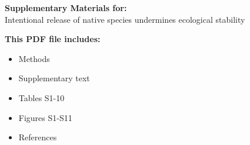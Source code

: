 \begin{center}
\LARGE{\textbf{Supplementary Materials for:}}\\[7.5mm]
\LARGE{Intentional release of native species undermines ecological stability}\\[7.5mm]
\end{center}
\begin{flushleft}
\textbf{This PDF file includes:}
\begin{itemize}
\item Methods
\item Supplementary text
\item Tables S1-10
\item Figures S1-S11
\item References
\end{itemize}
\end{flushleft}

\newpage